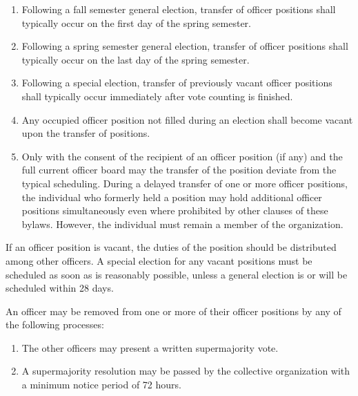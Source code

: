 \documentclass[11pt]{article}
\newcounter{h1}
\newcounter{h2}[h1]
\newcounter{h3}[h2]
\begin{document}

\begin{enumerate}
  \item Following a fall semester general election, transfer of officer positions shall typically occur on the first day of the spring semester.
  \item Following a spring semester general election, transfer of officer positions shall typically occur on the last day of the spring semester.
  \item Following a special election, transfer of previously vacant officer positions shall typically occur immediately after vote counting is finished.
  \item Any occupied officer position not filled during an election shall become vacant upon the transfer of positions.
  \item Only with the consent of the recipient of an officer position (if any) and the full current officer board may the transfer of the position deviate from the typical scheduling. During a delayed transfer of one or more officer positions, the individual who formerly held a position may hold additional officer positions simultaneously even where prohibited by other clauses of these bylaws. However, the individual must remain a member of the organization.
\end{enumerate}


If an officer position is vacant, the duties of the position should be distributed among other officers. A special election for any vacant positions must be scheduled as soon as is reasonably possible, unless a general election is or will be scheduled within 28 days.


An officer may be removed from one or more of their officer positions by any of the following processes:

\begin{enumerate}
  \item The other officers may present a written supermajority vote.
  \item A supermajority resolution may be passed by the collective organization with a minimum notice period of 72 hours.
\end{enumerate}


\end{document}
